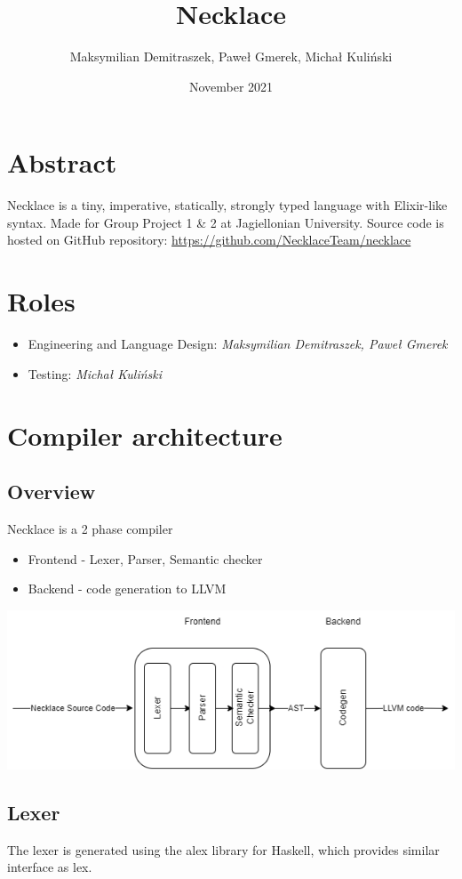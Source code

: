 \documentclass{article}
\title{Necklace}
\author{Maksymilian Demitraszek, Paweł Gmerek, Michał Kuliński}
\date{November 2021}
\begin{document}
\maketitle
\section{Abstract}
Necklace is a tiny, imperative, statically, strongly typed language with Elixir-like syntax.
Made for Group Project 1 \& 2 at Jagiellonian University. Source code is hosted on GitHub repository: \url{https://github.com/NecklaceTeam/necklace}

\section{Roles}
\begin{itemize}
    \item Engineering and Language Design: \textit{Maksymilian Demitraszek, Paweł Gmerek}
    \item Testing: \textit{Michał Kuliński}
\end{itemize}
\section{Compiler architecture}
\subsection{Overview}
Necklace is a 2 phase compiler
\begin{itemize}
    \item Frontend - Lexer, Parser, Semantic checker
    \item Backend - code generation to LLVM
\end{itemize}
\begin{center}
    \includegraphics[scale=0.5]{compiler}
\end{center}
\subsection{Lexer}
The lexer is generated using the alex library for Haskell, which provides similar interface as lex. 
\end{document}
